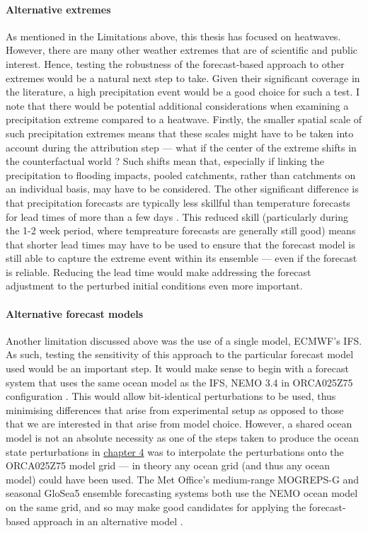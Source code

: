     \paragraph*{Alternative extremes}

      As mentioned in the Limitations above, this thesis has focused on heatwaves. However, there are many other weather extremes that are of scientific and public interest. Hence, testing the robustness of the forecast-based approach to other extremes would be a natural next step to take. Given their significant coverage in the literature, a high precipitation event would be a good choice for such a test. I note that there would be potential additional considerations when examining a precipitation extreme compared to a heatwave. Firstly, the smaller spatial scale of such precipitation extremes means that these scales might have to be taken into account during the attribution step --- what if the center of the extreme shifts in the counterfactual world \citep{schaller_role_2020}? Such shifts mean that, especially if linking the precipitation to flooding impacts, pooled catchments, rather than catchments on an individual basis, may have to be considered. The other significant difference is that precipitation forecasts are typically less skillful than temperature forecasts for lead times of more than a few days \citep{rodwell_medium-range_2006,vitart_evolution_2014,swinbank_tigge_2016,monhart_skill_2018,mishra_multi-model_2019,haiden_evaluation_2021}. This reduced skill (particularly during the 1-2 week period, where tempreature forecasts are generally still good) means that shorter lead times may have to be used to ensure that the forecast model is still able to capture the extreme event within its ensemble --- even if the forecast is reliable. Reducing the lead time would make addressing the forecast adjustment to the perturbed initial conditions even more important.

    \paragraph*{Alternative forecast models}

      Another limitation discussed above was the use of a single model, ECMWF's IFS. As such, testing the sensitivity of this approach to the particular forecast model used would be an important step. It would make sense to begin with a forecast system that uses the same ocean model as the IFS, NEMO 3.4 in ORCA025Z75 configuration \citep{madec_nemo_2008}. This would allow bit-identical perturbations to be used, thus minimising differences that arise from experimental setup as opposed to those that we are interested in that arise from model choice. However, a shared ocean model is not an absolute necessity as one of the steps taken to produce the ocean state perturbations in \hyperref[ch4]{chapter 4} was to interpolate the perturbations onto the ORCA025Z75 model grid --- in theory any ocean grid (and thus any ocean model) could have been used. The Met Office's medium-range MOGREPS-G and seasonal GloSea5 ensemble forecasting systems both use the NEMO ocean model on the same grid, and so may make good candidates for applying the forecast-based approach in an alternative model \citep{maclachlan_global_2015}.

